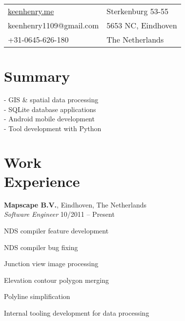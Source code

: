 \documentclass[margin,line]{resume}
\begin{document}
\begin{resume}

      \begin{tabular}{@{}p{6cm}p{8.5cm}}
      \url{keenhenry.me}      & Sterkenburg 53-55 \\
      keenhenry1109@gmail.com & 5653 NC, Eindhoven \\
      +31-0645-626-180        & The Netherlands \\
      \end{tabular}

 
    \section{\mysidestyle Summary}
      - GIS \& spatial data processing \\
      - SQLite database applications \\
      - Android mobile development \\
      - Tool development with Python \\
      
    \section{\mysidestyle Work \\ Experience}

    \textbf{Mapscape B.V.}, Eindhoven, The Netherlands \\
    \textsl{Software Engineer} \hfill 10/2011 -- Present \vspace{-3mm}\\\vspace{-1mm}%
      \begin{list2}
      \item NDS compiler feature development
      \item NDS compiler bug fixing
      \item Junction view image processing
      \item Elevation contour polygon merging
      \item Polyline simplification
      \item Internal tooling development for data processing
      \end{list2}


\end{resume}
\end{document}
